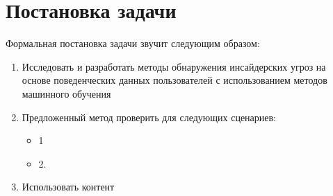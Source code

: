 \section{Постановка задачи}
Формальная постановка задачи звучит следующим образом:
\begin{enumerate}
\item Исследовать и разработать методы обнаружения инсайдерских угроз на основе поведенческих данных пользователей с использованием методов машинного обучения
\item Предложенный метод проверить для следующих сценариев:
\begin{itemize}
\item 1
\item 2.
\end{itemize}
\item Использовать контент
\end{enumerate}
\clearpage